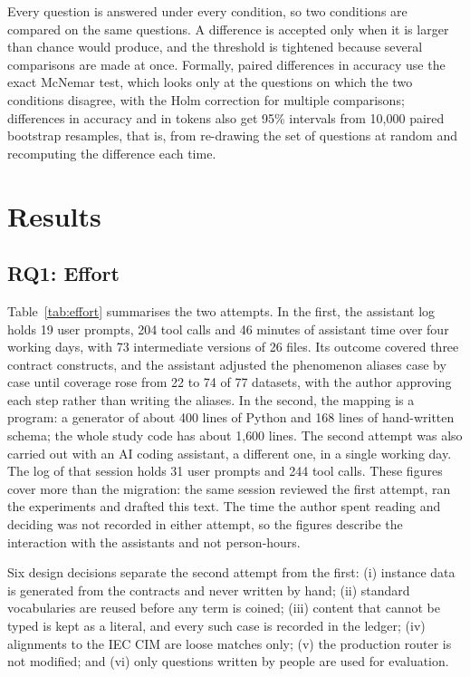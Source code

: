 Every question is answered under every condition, so two conditions are compared on the
same questions. A difference is accepted only when it is larger than chance would produce,
and the threshold is tightened because several comparisons are made at once. Formally,
paired differences in accuracy use the exact McNemar test, which looks only at the
questions on which the two conditions disagree, with the Holm correction for multiple
comparisons; differences in accuracy and in tokens also get 95\% intervals from 10{,}000
paired bootstrap resamples, that is, from re-drawing the set of questions at random and
recomputing the difference each time.

\section{Results}

\subsection{RQ1: Effort}
Table~\ref{tab:effort} summarises the two attempts. In the first, the assistant log holds
19 user prompts, 204 tool calls and 46 minutes of assistant time over four working days,
with 73 intermediate versions of 26 files. Its outcome covered three contract constructs,
and the assistant adjusted the phenomenon aliases case by case until coverage rose from 22
to 74 of 77 datasets, with the author approving each step rather than writing the aliases.
In the second, the mapping is a program: a generator of about 400 lines of Python and 168
lines of hand-written schema; the whole study code has about 1{,}600 lines.
The second attempt was also carried out with an AI coding assistant, a different one, in a
single working day. The log of that session holds 31 user prompts and 244 tool calls. These
figures cover more than the migration: the same session reviewed the first attempt, ran the
experiments and drafted this text. The time the author spent reading and deciding was not
recorded in either attempt, so the figures describe the interaction with the assistants and
not person-hours.

Six design decisions separate the second attempt from the first: (i) instance data is
generated from the contracts and never written by hand; (ii) standard vocabularies are
reused before any term is coined; (iii) content that cannot be typed is kept as a literal,
and every such case is recorded in the ledger; (iv) alignments to the IEC CIM are loose
matches only; (v) the production router is not modified; and (vi) only questions written
by people are used for evaluation.

